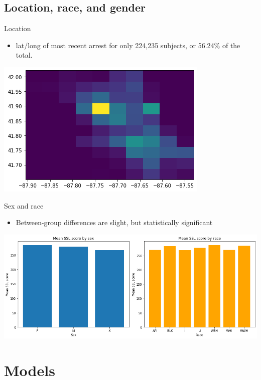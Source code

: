 \documentclass{beamer}
\begin{document}
\subsection{Location, race, and gender}
\begin{frame}{Location}
\begin{itemize}
    \item lat/long of most recent arrest for only 224,235 subjects, or 56.24\% of the total.
\end{itemize}
\begin{center}
    \includegraphics[scale=.5]{locations.png}
\end{center}
\end{frame}

\begin{frame}{Sex and race}
\begin{itemize}
    \item Between-group differences are slight, but statistically significant
\end{itemize}
\begin{center}
    \includegraphics[scale=.4]{race.png}
\end{center}
\end{frame}

\section{Models}
\end{document}
